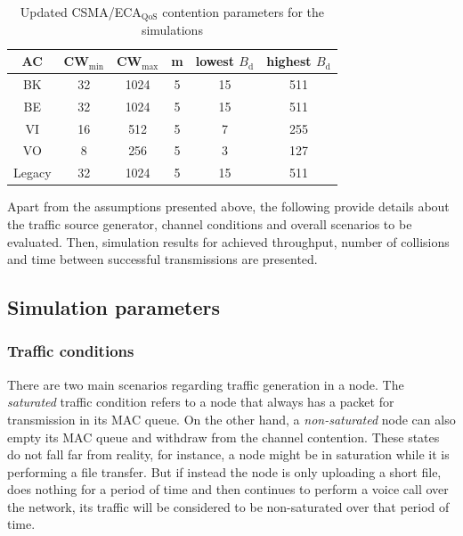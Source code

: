 	\begin{table}[t]
		\centering
		\caption{Updated CSMA/ECA$_{\text{QoS}}$ contention parameters for the simulations}
		\label{tab:newQoSparams}
		\begin{tabular}{|c|c|c|c|c|c|}
			\hline
			{\bfseries AC} & {\bfseries CW$_{\min}$} & {\bfseries CW$_{\max}$} & {\bfseries m} & {\bfseries lowest $B_{\text{d}}$} & {\bfseries highest $B_{\text{d}}$}\\
			\hline
			BK		       &	32				&		1024		  & 		5	&			15		        &		511\\
			BE		       &	32				&		1024		  &		5	&			15		        &		511\\
			VI		       &	16				&		512		  & 		5	&			7		        &		255\\
			VO		       &	8				&		256		  & 		5	&			3		        &		127\\
			Legacy	       &	32				&		1024		  & 		5	&			15		        &		511\\
			\hline
		\end{tabular}
	\end{table}
	
Apart from the assumptions presented above, the following provide details about the traffic source generator, channel conditions and overall scenarios to be evaluated. Then, simulation results for achieved throughput, number of collisions and time between successful transmissions are presented.

\subsection{Simulation parameters}\label{subsect:simParams}
\subsubsection{Traffic conditions}
There are two main scenarios regarding traffic generation in a node. The \emph{saturated} traffic condition refers to a node that always has a packet for transmission in its MAC queue. On the other hand, a \emph{non-saturated} node  can also empty its MAC queue and withdraw from the channel contention. These states do not fall far from reality, for instance, a node might be in saturation while it is performing a file transfer. But if instead the node is only uploading a short file, does nothing for a period of time and then continues to perform a voice call over the network, its traffic will be considered to be non-saturated over that period of time.

